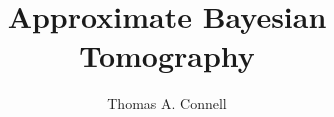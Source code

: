 \documentclass[mres, greychapternumbers]{mqthesis}
\begin{document}
\frontmatter

\title{Approximate Bayesian Tomography} %
\author{Thomas A. Connell} %

\titlepage


\linespread{1}\selectfont
\tableofcontents 
\listoffigures
\listoftables

\mainmatter

\makeatletter
\let\old@makechapterhead\@makechapterhead
\makeatletter
\def\thickhrulefill{\leavevmode \leaders \hrule height 1ex \hfill \kern \z@}
\def\@makechapterhead#1{%
  {\parindent \z@ \raggedright
    \reset@font
    \hrule
    \vspace*{10\p@}%
    \par
    \iftoggle{smallcapschapter}{  %
   	 \Large \sc \@chapapp{} \Huge\bfseries \thechapter
	}{
	\Large \@chapapp{} \Huge\bfseries \thechapter
	}
    \par\nobreak
    \vspace*{10\p@}%
    \hrule
    \par
    \vspace*{1\p@}%
    \hrule
    \vspace*{20\p@}
    \Huge \bfseries #1\par\nobreak
    \vskip 20\p@
  }}

\linespread{1.3}\selectfont
\end{document}
